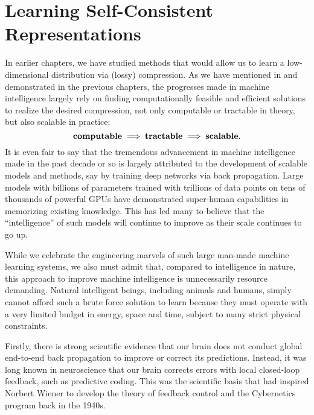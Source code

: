 \documentclass[../../book-main.tex]{subfiles}
\begin{document}

\section{Learning Self-Consistent Representations}
\label{sec:self-consistency}

In earlier chapters, we have studied methods that would allow us to learn a low-dimensional distribution via (lossy) compression. As we have mentioned in  and demonstrated in the previous chapters, the progresses made in machine intelligence largely rely on finding computationally feasible and efficient solutions to realize the desired compression, not only computable or tractable in theory, but also scalable in practice:
\begin{equation}
\mbox{\textbf{computable}} \;
   \Longrightarrow \; \mbox{\textbf{tractable}} \; \Longrightarrow \; 
   \mbox{\textbf{scalable}}.
\end{equation}
It is even fair to say that the tremendous advancement in machine intelligence made in the past decade or so is largely attributed to the development of scalable models and methods, say by training deep networks via back propagation. Large models with billions of parameters trained with trillions of data points on tens of thousands of powerful GPUs have demonstrated super-human capabilities in memorizing existing knowledge. This has led many to believe that the ``intelligence'' of such models will continue to improve as their scale continues to go up. 

While we celebrate the engineering marvels of such large man-made machine learning  systems, we also must admit that, compared to intelligence in nature, this approach to improve machine intelligence is unnecessarily resource demanding. Natural intelligent beings, including animals and humans, simply cannot afford such a brute force solution to learn because they must operate with a very limited budget in energy, space and time, subject to many strict physical constraints. 

Firstly, there is strong scientific evidence that our brain does not conduct global end-to-end back propagation to improve or correct its predictions. Instead, it was long known in neuroscience that our brain corrects errors with local closed-loop feedback, such as predictive coding. This was the scientific basis that had inspired Norbert Wiener to develop the theory of feedback control and the Cybernetics program back in the 1940s. 
\end{document}
